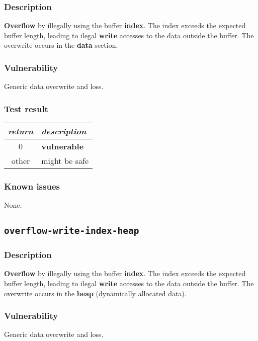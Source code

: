\documentclass[a4paper]{book}
\begin{document}
\subsubsection{Description}

\textbf{Overflow} by illegally using the buffer \textbf{index}.
The index exceeds the expected buffer length,
leading to ilegal \textbf{write} accesses to the data outside the buffer.
The overwrite occurs in the \textbf{data} section.

\subsubsection{Vulnerability}
Generic data overwrite and loss.

\subsubsection{Test result}

\begin{tabular}{cl}
  \toprule
  \emph{return}  & \emph{description} \\
  \midrule
  0              & \textbf{vulnerable} \\
  other          & might be safe \\
  \bottomrule
\end{tabular}

\subsubsection{Known issues}

None.

\newpage

\subsection{\texttt{overflow-write-index-heap}}\label{test-overflow-write-index-heap}

\subsubsection{Description}

\textbf{Overflow} by illegally using the buffer \textbf{index}.
The index exceeds the expected buffer length,
leading to ilegal \textbf{write} accesses to the data outside the buffer.
The overwrite occurs in the \textbf{heap} (dynamically allocated data).

\subsubsection{Vulnerability}
Generic data overwrite and loss.
\end{document}
